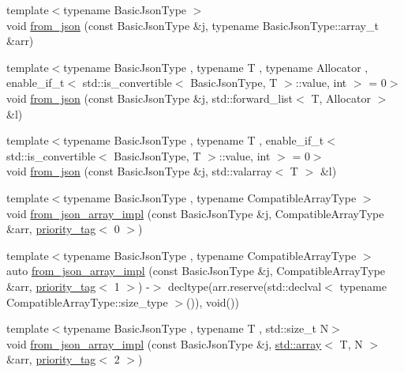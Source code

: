 \begin{DoxyCompactItemize}
\item 
{\footnotesize template$<$typename Basic\+Json\+Type $>$ }\\void \hyperlink{namespacenlohmann_1_1detail_abc62958462b916726b89f25fa381a129}{from\+\_\+json} (const Basic\+Json\+Type \&j, typename Basic\+Json\+Type\+::array\+\_\+t \&arr)
\item 
{\footnotesize template$<$typename Basic\+Json\+Type , typename T , typename Allocator , enable\+\_\+if\+\_\+t$<$ std\+::is\+\_\+convertible$<$ Basic\+Json\+Type, T $>$\+::value, int $>$  = 0$>$ }\\void \hyperlink{namespacenlohmann_1_1detail_a5cfb765aad92795abd7fda29d017272a}{from\+\_\+json} (const Basic\+Json\+Type \&j, std\+::forward\+\_\+list$<$ T, Allocator $>$ \&l)
\item 
{\footnotesize template$<$typename Basic\+Json\+Type , typename T , enable\+\_\+if\+\_\+t$<$ std\+::is\+\_\+convertible$<$ Basic\+Json\+Type, T $>$\+::value, int $>$  = 0$>$ }\\void \hyperlink{namespacenlohmann_1_1detail_a3df497b1d3977f071b488ecac1401517}{from\+\_\+json} (const Basic\+Json\+Type \&j, std\+::valarray$<$ T $>$ \&l)
\item 
{\footnotesize template$<$typename Basic\+Json\+Type , typename Compatible\+Array\+Type $>$ }\\void \hyperlink{namespacenlohmann_1_1detail_ac53673a5ce29fb69b96d41dad33cb3b0}{from\+\_\+json\+\_\+array\+\_\+impl} (const Basic\+Json\+Type \&j, Compatible\+Array\+Type \&arr, \hyperlink{structnlohmann_1_1detail_1_1priority__tag}{priority\+\_\+tag}$<$ 0 $>$)
\item 
{\footnotesize template$<$typename Basic\+Json\+Type , typename Compatible\+Array\+Type $>$ }\\auto \hyperlink{namespacenlohmann_1_1detail_a57f93ed57254a1639087cdc316e0fb83}{from\+\_\+json\+\_\+array\+\_\+impl} (const Basic\+Json\+Type \&j, Compatible\+Array\+Type \&arr, \hyperlink{structnlohmann_1_1detail_1_1priority__tag}{priority\+\_\+tag}$<$ 1 $>$) -\/$>$ decltype(arr.\+reserve(std\+::declval$<$ typename Compatible\+Array\+Type\+::size\+\_\+type $>$()), void())
\item 
{\footnotesize template$<$typename Basic\+Json\+Type , typename T , std\+::size\+\_\+t N$>$ }\\void \hyperlink{namespacenlohmann_1_1detail_a46b0781205d0bdc5a959343b389966a4}{from\+\_\+json\+\_\+array\+\_\+impl} (const Basic\+Json\+Type \&j, \hyperlink{namespacenlohmann_1_1detail_a90aa5ef615aa8305e9ea20d8a947980faf1f713c9e000f5d3f280adbd124df4f5}{std\+::array}$<$ T, N $>$ \&arr, \hyperlink{structnlohmann_1_1detail_1_1priority__tag}{priority\+\_\+tag}$<$ 2 $>$)

\end{DoxyCompactItemize}
